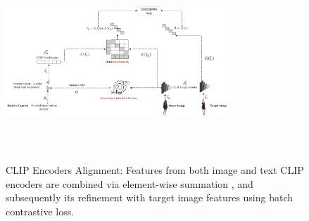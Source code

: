 \documentclass[10pt,lineno]{wlpeerj}
\begin{document}
\begin{figure}[t]
    \centering      \includegraphics[width=0.75\textwidth,height=75mm]{CLIP_Encoders_Alignment.jpg}
        \caption{CLIP Encoders Alignment: Features from both image and text CLIP  encoders are combined via element-wise summation , and subsequently its refinement with target image features using batch contrastive loss.}
    \label{fig:proposed_framework}
\end{figure}
\end{document}
